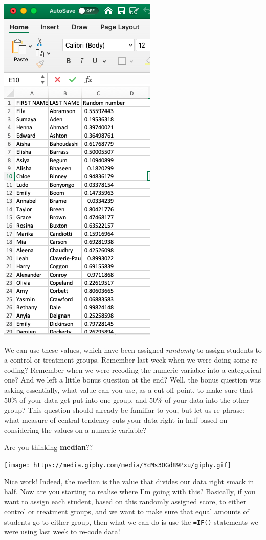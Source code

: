 \documentclass[
]{book}
\begin{document}
\includegraphics{imgs/rand_nums.png}

We can use these values, which have been assigned \emph{randomly} to assign students to a control or treatment groups. Remember last week when we were doing some re-coding? Remember when we were recoding the numeric variable into a categorical one? And we left a little bonus question at the end? Well, the bonus question was asking essentially, what value can you use, as a cut-off point, to make sure that 50\% of your data get put into one group, and 50\% of your data into the other group? This question should already be familiar to you, but let us re-phrase: what measure of central tendency cuts your data right in half based on considering the values on a numeric variable?

Are you thinking \textbf{median}??

\texttt{[image: https://media.giphy.com/media/YcMs3OGd89Pxu/giphy.gif]}

Nice work! Indeed, the median is the value that divides our data right smack in half. Now are you starting to realise where I'm going with this? Basically, if you want to assign each student, based on this randomly assigned score, to either control or treatment groups, and we want to make sure that equal amounts of students go to either group, then what we can do is use the \texttt{=IF()} statements we were using last week to re-code data!
\end{document}
